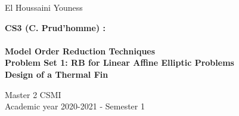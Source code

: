 \documentclass {report}
\begin{document}
\baselineskip=0.5cm
\begin{center}
\huge{El Houssaini Youness}
\end{center}
\vspace{4cm}
\begin{center}
\Huge{\bf  CS3 (C. Prud'homme) : \\ \  \\Model Order Reduction Techniques \\
Problem Set 1: RB for Linear Affine Elliptic Problems \\
Design of a Thermal Fin}
\end{center}
\vspace{7cm}
\hspace{10.5cm}\Large{Master 2 CSMI \vspace{0.2cm}\\ \hspace*{5.6cm}Academic year 2020-2021 - Semester 1}\normalsize
\tableofcontents
\newpage
	

	






\nocite{*}

\end{document}
